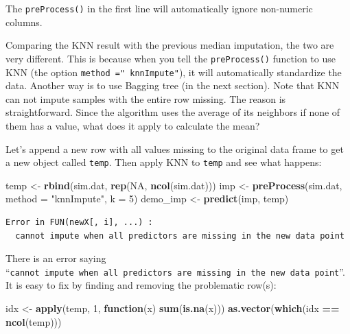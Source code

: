 \documentclass[12pt,]{krantz}
\makeatletter
\newenvironment{Shaded}{\begin{snugshade}}{\end{snugshade}}
\newcommand{\ControlFlowTok}[1]{\textcolor[rgb]{0.27,0.27,0.27}{\textbf{#1}}}
\newcommand{\DataTypeTok}[1]{\textcolor[rgb]{0.27,0.27,0.27}{#1}}
\newcommand{\DecValTok}[1]{\textcolor[rgb]{0.06,0.06,0.06}{#1}}
\newcommand{\KeywordTok}[1]{\textcolor[rgb]{0.27,0.27,0.27}{\textbf{#1}}}
\newcommand{\NormalTok}[1]{#1}
\newcommand{\OperatorTok}[1]{\textcolor[rgb]{0.43,0.43,0.43}{\textbf{#1}}}
\newcommand{\OtherTok}[1]{\textcolor[rgb]{0.37,0.37,0.37}{#1}}
\newcommand{\StringTok}[1]{\textcolor[rgb]{0.5,0.5,0.5}{#1}}
\newenvironment{kframe}{%
\medskip{}
\setlength{\fboxsep}{.8em}
 \def\at@end@of@kframe{}%
 \ifinner\ifhmode%
  \def\at@end@of@kframe{\end{minipage}}%
  \begin{minipage}{\columnwidth}%
 \fi\fi%
 \def\FrameCommand##1{\hskip\@totalleftmargin \hskip-\fboxsep
 \colorbox{shadecolor}{##1}\hskip-\fboxsep
     \hskip-\linewidth \hskip-\@totalleftmargin \hskip\columnwidth}%
 \MakeFramed {\advance\hsize-\width
   \@totalleftmargin\z@ \linewidth\hsize
   \@setminipage}}%
 {\par\unskip\endMakeFramed%
 \at@end@of@kframe}
\renewenvironment{Shaded}{\begin{kframe}}{\end{kframe}}
\makeatother
\begin{document}
The \texttt{preProcess()} in the first line will automatically ignore non-numeric columns.

Comparing the KNN result with the previous median imputation, the two are very different. This is because when you tell the \texttt{preProcess()} function to use KNN (the option \texttt{method\ ="\ knnImpute"}), it will automatically standardize the data.
Another way is to use Bagging tree (in the next section). Note that KNN can not impute samples with the entire row missing. The reason is straightforward. Since the algorithm uses the average of its neighbors if none of them has a value, what does it apply to calculate the mean?

Let's append a new row with all values missing to the original data frame to get a new object called \texttt{temp}. Then apply KNN to \texttt{temp} and see what happens:

\begin{Shaded}
\begin{Highlighting}[]
\NormalTok{temp <-}\StringTok{ }\KeywordTok{rbind}\NormalTok{(sim.dat, }\KeywordTok{rep}\NormalTok{(}\OtherTok{NA}\NormalTok{, }\KeywordTok{ncol}\NormalTok{(sim.dat)))}
\NormalTok{imp <-}\StringTok{ }\KeywordTok{preProcess}\NormalTok{(sim.dat, }\DataTypeTok{method =} \StringTok{"knnImpute"}\NormalTok{, }\DataTypeTok{k =} \DecValTok{5}\NormalTok{)}
\NormalTok{demo_imp <-}\StringTok{ }\KeywordTok{predict}\NormalTok{(imp, temp)}
\end{Highlighting}
\end{Shaded}

\begin{verbatim}
Error in FUN(newX[, i], ...) : 
  cannot impute when all predictors are missing in the new data point
\end{verbatim}

There is an error saying ``\texttt{cannot\ impute\ when\ all\ predictors\ are\ missing\ in\ the\ new\ data\ point}''. It is easy to fix by finding and removing the problematic row(s):

\begin{Shaded}
\begin{Highlighting}[]
\NormalTok{idx <-}\StringTok{ }\KeywordTok{apply}\NormalTok{(temp, }\DecValTok{1}\NormalTok{, }\ControlFlowTok{function}\NormalTok{(x) }\KeywordTok{sum}\NormalTok{(}\KeywordTok{is.na}\NormalTok{(x)))}
\KeywordTok{as.vector}\NormalTok{(}\KeywordTok{which}\NormalTok{(idx }\OperatorTok{==}\StringTok{ }\KeywordTok{ncol}\NormalTok{(temp)))}
\end{Highlighting}
\end{Shaded}
\end{document}
